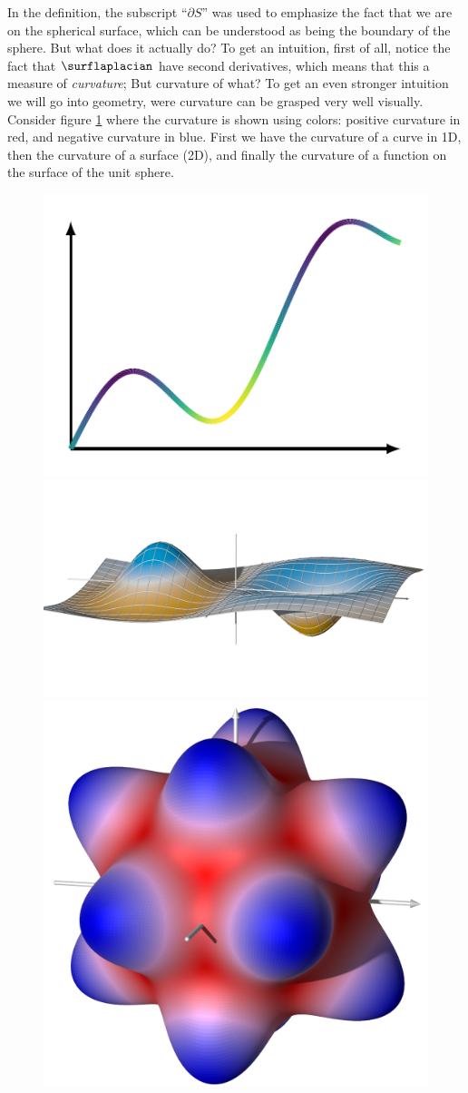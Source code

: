 In the definition, the subscript ``$\partial S$'' was used to emphasize the fact
that we are on the spherical surface, which can be understood as being the
boundary of the sphere. But what does it actually do? To get an intuition, first
of all, notice the fact that $\surflaplacian$ have second derivatives, which
means that this a measure of \emph{curvature}; But curvature of what? To get an
even stronger intuition we will go into geometry, were curvature can be grasped
very well visually. Consider figure \ref{kugel:fig:curvature} where the
curvature is shown using colors: positive curvature in red, and negative
curvature in blue. First we have the curvature of a curve in 1D, then the
curvature of a surface (2D), and finally the curvature of a function on the
surface of the unit sphere.

\begin{figure}
  \centering
  \includegraphics[width=.3\linewidth]{papers/kugel/figures/tikz/curvature-1d}
  \hskip 5mm
  \includegraphics[width=.3\linewidth]{papers/kugel/figures/povray/curvature}
  \hskip 5mm
  \includegraphics[width=.3\linewidth]{papers/kugel/figures/povray/spherecurve}
  \caption{
    \label{kugel:fig:curvature}
  }
\end{figure}

